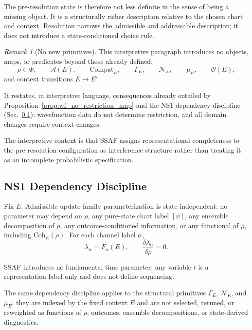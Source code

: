 \documentclass[aps,prx,onecolumn,11pt]{revtex4-2}
\theoremstyle{plain}
\theoremstyle{definition}
\theoremstyle{remark}
\newtheorem{remark}{Remark}
\begin{document}
\noindent
The pre-resolution state is therefore not less definite in the sense of
being a missing object. It is a structurally richer description relative
to the chosen chart and context. Resolution narrows the admissible and
addressable description; it does not introduce a state-conditioned
choice rule.

\begin{remark}[No new primitives]
This interpretive paragraph introduces no objects, maps, or predicates
beyond those already defined:
\[
\rho\in\Phi,
\qquad
\mathcal A(E),
\qquad
\mathrm{Compat}_E,
\qquad
\Gamma_E,
\qquad
\mathcal N_E,
\qquad
\mu_E,
\qquad
\mathcal O(E),
\]
and context transitions \(E\to E'\).

It restates, in interpretive language, consequences already entailed by
Proposition~\ref{prop:wf_no_restriction_map} and the NS1 dependency
discipline (Sec.~\ref{subsec:NS1_commitment}): wavefunction data do not
determine restriction, and all domain changes require context changes.

The interpretive content is that SSAF assigns representational
completeness to the pre-resolution configuration as interference
structure rather than treating it as an incomplete probabilistic
specification.
\end{remark}

\subsection{NS1 Dependency Discipline}
\label{subsec:NS1_commitment}

Fix \(E\). Admissible update-family parameterization is
state-independent: no parameter may depend on \(\rho\), any pure-state
chart label \([\psi]\), any ensemble decomposition of \(\rho\), any
outcome-conditioned information, or any functional of \(\rho\),
including \(\mathrm{Coh}_E(\rho)\). For each channel label \(\alpha\),
\begin{equation}
\lambda_\alpha = F_\alpha(E),
\qquad
\frac{\delta\lambda_\alpha}{\delta\rho}=0.
\label{eq:NS1_rate_functional}
\end{equation}

SSAF introduces no fundamental time parameter; any variable \(t\) is a
representation label only and does not define sequencing.

The same dependency discipline applies to the structural primitives
\(\Gamma_E\), \(\mathcal N_E\), and \(\mu_E\): they are indexed by the
fixed context \(E\) and are not selected, retuned, or reweighted as
functions of \(\rho\), outcomes, ensemble decompositions, or
state-derived diagnostics.
\end{document}
